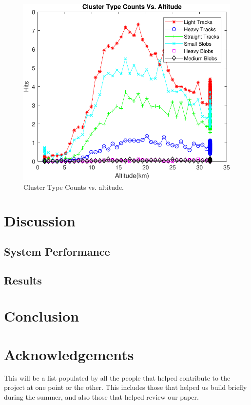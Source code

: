 \documentclass[final,1p, times, twocolumn]{elsarticle}
\begin{document}
\begin{figure}[h]
\centering
\caption{Cluster Type Counts vs. altitude.}
\includegraphics[scale=.5
]{ctva-cropped.pdf}
\end{figure}

\section{Discussion}
\label{Discussion}
\subsection{System Performance}
\subsection{Results}
\section{Conclusion}
\label{Conclusion}

\section{Acknowledgements}
\label{Acknowledgements}
This will be a list populated by all the people that helped contribute to the project at one point or the other.  This includes those that helped us build briefly during the summer, and also those that helped review our paper.
\end{document}
